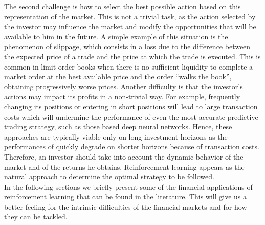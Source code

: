 The second challenge is how to select the best possible action based on this representation of the market. This is not a trivial task, as the action selected by the investor may influence the market and modify the opportunities that will be available to him in the future. A simple example of this situation is the phenomenon of slippage, which consists in a loss due to the difference between the expected price of a trade and the price at which the trade is executed. This is common in limit-order books when there is no sufficient liquidity to complete a market order at the best available price and the order ``walks the book'', obtaining progressively worse prices. Another difficulty is that the investor's actions may impact its profits in a non-trivial way. 
For example, frequently changing its positions or entering in short positions will lead to large transaction costs which will undermine the performance of even the most accurate predictive trading strategy, such as those based deep neural networks. Hence, these approaches are typically viable only on long investment horizons as the performances of quickly degrade on shorter horizons because of transaction costs. Therefore, an investor should take into account the dynamic behavior of the market and of the returns he obtains. Reinforcement learning appears as the natural approach to determine the optimal strategy to be followed.\\
In the following sections we briefly present some of the financial applications of reinforcement learning that can be found in the literature. This will give us a better feeling for the intrinsic difficulties of the financial markets and for how they can be tackled. 

